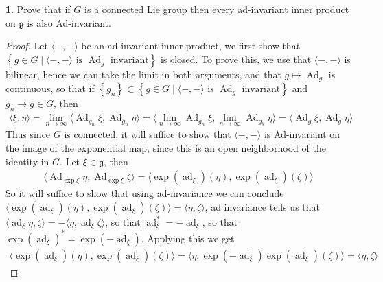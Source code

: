 \documentclass[10.5pt]{article}
\theoremstyle{definition}
\newtheorem{pb}{}
\newcommand{\set}[1]{\left\{#1\right\}}
\newcommand{\gen}[1]{\langle#1\rangle}
\newcommand{\spg}{\mathfrak{g}}
\begin{document}
    \begin{pb}
        Prove that if \(G\) is a connected Lie group then every ad-invariant inner product on \(\mathfrak{g}\) is also Ad-invariant.

        \begin{proof}
            Let \(\gen{-,-}\) be an ad-invariant inner product, we first show that \(\set{g \in G \mid \gen{-,-} \text{ is } \operatorname{Ad}_g \text{ invariant}}\) is closed. To prove this, we use that \(\gen{-,-}\) is bilinear, hence we can take the limit in both arguments, and that \(g \mapsto \operatorname{Ad}_g\) is continuous, so that if \(\set{g_n} \subset \set{g \in G \mid \gen{-,-} \text{ is } \operatorname{Ad}_g \text{ invariant}}\) and \(g_n \to g \in G\), then
            \begin{align*}
                \gen{\xi,\eta} = \lim_{n\to\infty}\gen{\operatorname{Ad}_{g_n}\xi,\operatorname{Ad}_{g_n}\eta} = \gen{\lim_{n\to\infty}\operatorname{Ad}_{g_n}\xi,\lim_{n\to\infty}\operatorname{Ad}_{g_k}\eta} = \gen{\operatorname{Ad}_{g}\xi,\operatorname{Ad}_{g}\eta}
            \end{align*}
            Thus since \(G\) is connected, it will suffice to show that \(\gen{-,-}\) is Ad-invariant on the image of the exponential map, since this is an open neighborhood of the identity in \(G\). Let \(\xi \in \spg\), then
            \begin{align*}
                \gen{\operatorname{Ad}_{\exp\xi}\eta,\operatorname{Ad}_{\exp\xi}\zeta} = \gen{\exp(\operatorname{ad}_\xi)(\eta),\exp(\operatorname{ad}_\xi)(\zeta)}
            \end{align*}
            So it will suffice to show that using ad-invariance we can conclude \(\gen{\exp(\operatorname{ad}_\xi)(\eta),\exp(\operatorname{ad}_\xi)(\zeta)} = \gen{\eta,\zeta}\), ad invariance tells us that \(\gen{\operatorname{ad}_\xi\eta,\zeta} = -\gen{\eta,\operatorname{ad}_\xi \zeta}\), so that \(\operatorname{ad}_\xi^* = -\operatorname{ad}_\xi\), so that \(\exp(\operatorname{ad}_\xi)^* = \exp(-\operatorname{ad}_\xi)\). Applying this we get
            \begin{align*}
                \gen{\exp(\operatorname{ad}_\xi)(\eta),\exp(\operatorname{ad}_\xi)(\zeta)} = \gen{\eta,\exp(-\operatorname{ad}_\xi)\exp(\operatorname{ad}_\xi)(\zeta)} = \gen{\eta,\zeta}
            \end{align*}
        \end{proof}
    \end{pb}
\end{document}
